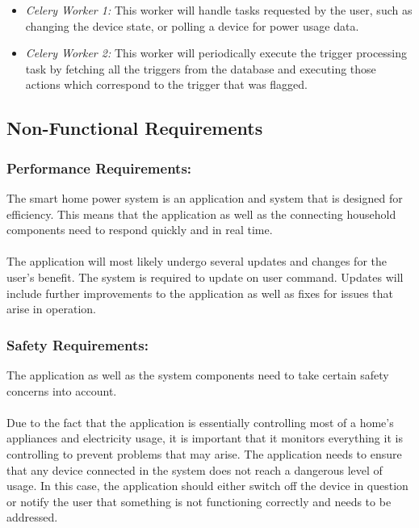 \documentclass[10pt,twocolumn]{witseiepaper}
\begin{document}
\begin{itemize}
		\begin{itemize}
			\item \textit{Celery Worker 1:} This worker will handle tasks requested by the user, such as changing the device state, or polling a device for power usage data. 
			\item \textit{Celery Worker 2:} This worker will periodically execute the trigger processing task by fetching all the triggers from the database and executing those actions which correspond to the trigger that was flagged. 
		\end{itemize}
	\end{itemize}
	
	\subsection{Non-Functional Requirements}
	\subsubsection{Performance Requirements:}
	The smart home power system is an application and system that is designed for efficiency. This means that the application as well as the connecting household components need to respond quickly and in real time. 
	\\\\
	The application will most likely undergo several updates and changes for the user's benefit. The system is required to update on user command. Updates will include further improvements to the application as well as fixes for issues that arise in operation.
	
	\subsubsection{Safety Requirements:} 
	The application as well as the system components need to take certain safety concerns into account. 
	\\\\
	Due to the fact that the application is essentially controlling most of a home's appliances and electricity usage, it is important that it monitors everything it is controlling to prevent problems that may arise. The application needs to ensure that any device connected in the system does not reach a dangerous level of usage. In this case, the application should either switch off the device in question or notify the user that something is not functioning correctly and needs to be addressed. 
	
\end{document}
